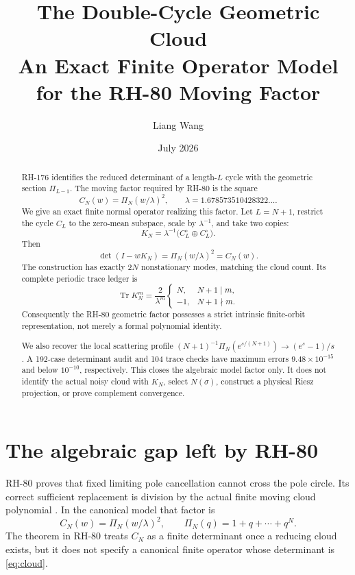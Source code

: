 \documentclass[12pt]{article}
\title{The Double-Cycle Geometric Cloud\\
\large An Exact Finite Operator Model for the RH-80 Moving Factor}
\author{Liang Wang}
\date{July 2026}
\theoremstyle{remark}
\newcommand{\Tr}{\operatorname{Tr}}
\begin{document}
\maketitle

\begin{abstract}
RH-176 identifies the reduced determinant of a length-$L$ cycle with the
geometric section $\Pi_{L-1}$.  The moving factor required by RH-80 is the
square
\[
 C_N(w)=\Pi_N(w/\lambda)^2,
 \qquad \lambda=1.678573510428322\ldots.
\]
We give an exact finite normal operator realizing this factor.  Let
$L=N+1$, restrict the cycle $C_L$ to the zero-mean subspace, scale by
$\lambda^{-1}$, and take two copies:
\[
 K_N=\lambda^{-1}
 \bigl(C_L^\circ\oplus C_L^\circ\bigr).
\]
Then
\[
 \det(I-wK_N)=\Pi_N(w/\lambda)^2=C_N(w).
\]
The construction has exactly $2N$ nonstationary modes, matching the cloud
count.  Its complete periodic trace ledger is
\[
 \Tr K_N^m=
 \frac{2}{\lambda^m}
 \begin{cases}
 N,&N+1\mid m,\\
 -1,&N+1\nmid m.
 \end{cases}
\]
Consequently the RH-80 geometric factor possesses a strict intrinsic
finite-orbit representation, not merely a formal polynomial identity.

We also recover the local scattering profile
$(N+1)^{-1}\Pi_N(e^{s/(N+1)})\to(e^s-1)/s$.  A 192-case determinant audit and
104 trace checks have maximum errors $9.48\times10^{-15}$ and below
$10^{-10}$, respectively.  This closes the algebraic model factor only.  It
does not identify the actual noisy cloud with $K_N$, select $N(\sigma)$,
construct a physical Riesz projection, or prove complement convergence.
\end{abstract}

\section{The algebraic gap left by RH-80}

RH-80 proves that fixed limiting pole cancellation cannot cross the pole
circle.  Its correct sufficient replacement is division by the actual finite
moving cloud polynomial \citep{WangRH80}.  In the canonical model that factor
is
\begin{equation}\label{eq:cloud}
 C_N(w)=\Pi_N(w/\lambda)^2,
 \qquad
 \Pi_N(q)=1+q+\cdots+q^N.
\end{equation}
The theorem in RH-80 treats $C_N$ as a finite determinant once a reducing
cloud exists, but it does not specify a canonical finite operator whose
determinant is \eqref{eq:cloud}.
\end{document}
